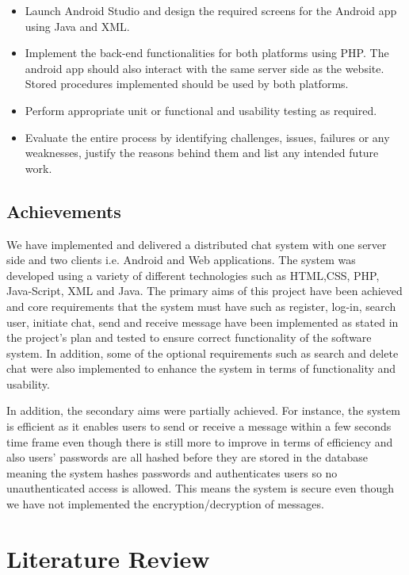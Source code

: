 \documentclass{article}
\begin{document}
\begin{itemize}
    \item Launch Android Studio and design the required screens for the Android app using Java and XML. 
    \item Implement the back-end functionalities for both platforms using PHP. The android app should also interact with the same server side as the website. Stored procedures implemented should be used by both platforms. 
    \item Perform appropriate unit or functional and usability testing as required. 
    \item Evaluate the entire process by identifying challenges, issues, failures or any weaknesses, justify the reasons behind them and list any intended future work. 
\end{itemize}

\subsection{Achievements}
We have implemented and delivered a distributed chat system with one server side and two clients i.e. Android and Web applications. The system was developed using a variety of different technologies such as HTML,CSS, PHP, Java-Script, XML and Java. The primary aims of this project have been achieved and core requirements that the system must have such as register, log-in, search user, initiate chat, send and receive message have been implemented as stated in the project's plan and tested to ensure correct functionality of the software system. In addition, some of the optional requirements such as search and delete chat were also implemented to enhance the system in terms of functionality and usability. \par

In addition, the secondary aims were partially achieved. For instance, the system is efficient as it enables users to send or receive a message within a few seconds time frame even though there is still more to improve in terms of efficiency and also users' passwords are all hashed before they are stored in the database meaning the system hashes passwords and authenticates users so no unauthenticated access is allowed. This means the system is secure even though we have not implemented the encryption/decryption of messages. 

\newpage
\section{Literature Review}
\end{document}
